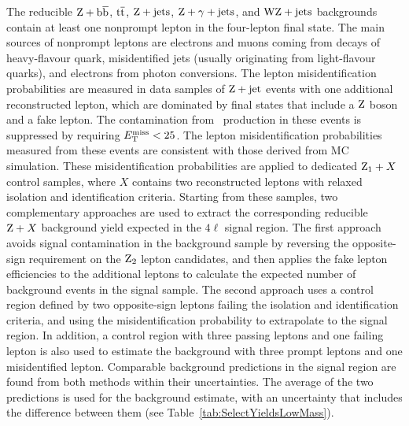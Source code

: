 \documentclass[11pt,twoside,a4paper,cmspaper,final,collab]{cms-tdr}
\begin{document}
The reducible $\mathrm{Z}+\mathrm{b}\overline{\mathrm{b}}$, $\mathrm{t}\overline{\mathrm{t}}$, $\mathrm{Z}+\text{jets}$,  $\mathrm{Z}+\gamma+\text{jets}$, and  $\mathrm{W}\mathrm{Z}+\text{jets}$ backgrounds
contain at least one nonprompt lepton in the four-lepton final state.
The main sources of nonprompt leptons are electrons and muons coming from
decays of heavy-flavour quark, misidentified jets (usually originating from light-flavour quarks),
and electrons from photon conversions.
The lepton misidentification probabilities are measured in data samples of $\mathrm{Z}+\text{jet}$ events
with one additional reconstructed lepton, which are dominated by final states that
include a $\mathrm{Z}$ boson and a fake lepton.
The contamination from \PW\cPZ\ production in these events is suppressed by
requiring $E_{\mathrm{T}}^{\text{miss}} <25$\GeV.
The lepton misidentification probabilities measured from these events are consistent with those
derived from MC simulation.
These misidentification probabilities are applied to dedicated
$\mathrm{Z}_1+X$ control samples, where $X$ contains two reconstructed leptons with relaxed isolation and identification
criteria.  Starting from these samples, two complementary approaches
are used  to extract  the corresponding reducible $\mathrm{Z}+X$ background
yield expected in the $4\ell$ signal region.
The first approach
avoids signal contamination in the background sample by reversing the
opposite-sign requirement on the $\mathrm{Z}_2$ lepton candidates, and then applies
the fake lepton efficiencies to the additional leptons to calculate the
expected number of background events in the signal sample.
The second approach  uses a control region defined by two opposite-sign leptons failing the isolation
and identification criteria, and using the misidentification probability to extrapolate to the signal region.
In addition, a control region with three passing leptons and one failing lepton is also used to
estimate the background with three prompt leptons and one misidentified lepton.
Comparable background predictions in the signal region are found  from
both methods within their uncertainties. The average of the two predictions is used
for the background estimate, with an uncertainty that includes the difference
between them (see Table~\ref{tab:SelectYieldsLowMass}).
\end{document}
